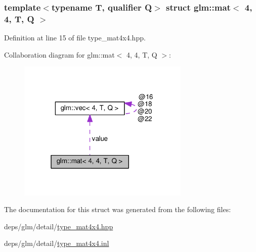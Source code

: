 \subsubsection*{template$<$typename T, qualifier Q$>$\newline
struct glm\+::mat$<$ 4, 4, T, Q $>$}



Definition at line 15 of file type\+\_\+mat4x4.\+hpp.



Collaboration diagram for glm\+:\+:mat$<$ 4, 4, T, Q $>$\+:
\nopagebreak
\begin{figure}[H]
\begin{center}
\leavevmode
\includegraphics[width=232pt]{d3/d45/structglm_1_1mat_3_014_00_014_00_01T_00_01Q_01_4__coll__graph}
\end{center}
\end{figure}


The documentation for this struct was generated from the following files\+:\begin{DoxyCompactItemize}
\item 
deps/glm/detail/\hyperlink{type__mat4x4_8hpp}{type\+\_\+mat4x4.\+hpp}\item 
deps/glm/detail/\hyperlink{type__mat4x4_8inl}{type\+\_\+mat4x4.\+inl}\end{DoxyCompactItemize}
